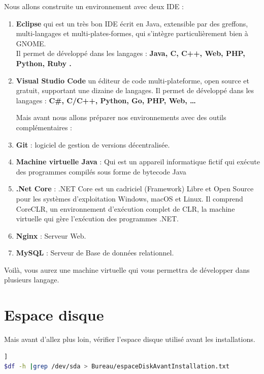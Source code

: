 	Nous allons construite un environnement avec deux IDE : 
	\begin{enumerate}[label=\arabic*)]
		\item \textbf{Eclipse} qui est un très bon IDE écrit en Java, extensible par des greffons, multi-langages et multi-plates-formes, qui s'intègre particulièrement bien à GNOME. \\
		Il permet de développé dans les langages : \textbf{Java, C, C++, Web, PHP, Python, Ruby .}
		
		\item\textbf{Visual Studio Code} un éditeur de code multi-plateforme, open source et gratuit, supportant une dizaine de langages.
		Il permet de développé dans les langages : \textbf{C\#, C/C++, Python, Go, PHP, Web, …}
		\vspace{10pt}
		
		
		
		Mais avant nous allons préparer nos environnements avec des outils complémentaires :
		
		\item \textbf{Git} : logiciel de gestion de versions décentralisée. 
		\item \textbf{Machine virtuelle Java} : Qui est un appareil informatique fictif qui exécute des programmes compilés sous forme de bytecode Java
		\item \textbf{.Net Core} : .NET Core est un cadriciel (Framework) Libre et Open Source pour les systèmes d'exploitation Windows, macOS et Linux. Il comprend CoreCLR, un environnement d'exécution complet de CLR, la machine virtuelle qui gère l'exécution des programmes .NET. 
		\item \textbf{Nginx} : Serveur Web.
		\item \textbf{MySQL} : Serveur de Base de données relationnel.
	\end{enumerate} 
	Voilà, vous aurez une machine virtuelle qui vous permettra de développer dans plusieurs langage.\\
	

\section{Espace disque}
Mais avant d'allez plus loin, vérifier l'espace disque utilisé avant les installations.
\begin{lstlisting}[language=bash]   ]
$df -h |grep /dev/sda > Bureau/espaceDiskAvantInstallation.txt
\end{lstlisting}

